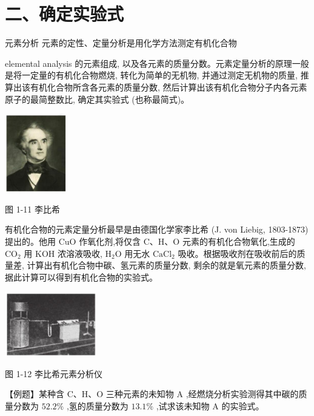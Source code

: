 \documentclass[10pt]{article}
\begin{document}
\section*{二、确定实验式}

元素分析 元素的定性、定量分析是用化学方法测定有机化合物

elemental analysis 的元素组成, 以及各元素的质量分数。元素定量分析的原理一般是将一定量的有机化合物燃烧, 转化为简单的无机物, 并通过测定无机物的质量, 推算出该有机化合物所含各元素的质量分数, 然后计算出该有机化合物分子内各元素原子的最简整数比, 确定其实验式 (也称最简式)。

\begin{center}
\includegraphics[max width=0.2\textwidth]{images/0190efc5-b58a-7c43-bfb0-e0a030df9cfd_21_709623.jpg}
\end{center}

图 1-11 李比希

有机化合物的元素定量分析最早是由德国化学家李比希 (J. von Liebig, 1803-1873) 提出的。他用 \(\mathrm{{CuO}}\) 作氧化剂,将仅含 \(\mathrm{C}\text{、}\mathrm{H}\text{、}\mathrm{O}\) 元素的有机化合物氧化,生成的 \({\mathrm{{CO}}}_{2}\) 用 \(\mathrm{{KOH}}\) 浓溶液吸收, \({\mathrm{H}}_{2}\mathrm{O}\) 用无水 \({\mathrm{{CaCl}}}_{2}\) 吸收。根据吸收剂在吸收前后的质量差, 计算出有机化合物中碳、氢元素的质量分数, 剩余的就是氧元素的质量分数, 据此计算可以得到有机化合物的实验式。

\begin{center}
\includegraphics[max width=0.3\textwidth]{images/0190efc5-b58a-7c43-bfb0-e0a030df9cfd_22_507762.jpg}
\end{center}

图 1-12 李比希元素分析仪

【例题】某种含 \(\mathrm{C}\text{、}\mathrm{H}\text{、}\mathrm{O}\) 三种元素的未知物 \(\mathrm{A}\) ,经燃烧分析实验测得其中碳的质量分数为 \({52.2}\%\) ,氢的质量分数为 \({13.1}\%\) ,试求该未知物 \(\mathrm{A}\) 的实验式。
\end{document}
